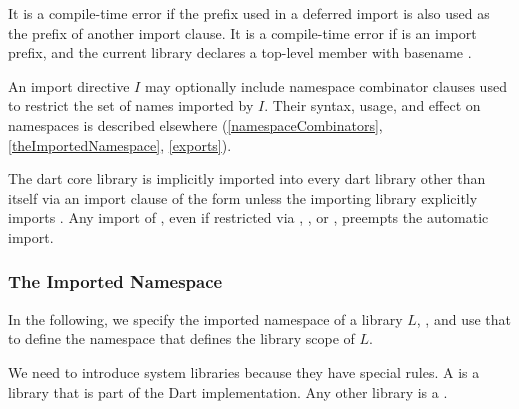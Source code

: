 \documentclass[makeidx]{article}
\begin{document}
{\LMHash{}%
It is a compile-time error if the prefix used in a deferred import
is also used as the prefix of another import clause.
It is a compile-time error if \id{} is an import prefix,
and the current library declares a top-level member with basename \id.

\LMHash{}%
An import directive $I$ may optionally include namespace combinator clauses
used to restrict the set of names imported by $I$.
Their syntax, usage, and effect on namespaces is described elsewhere
(\ref{namespaceCombinators}, \ref{theImportedNamespace},
\ref{exports}).

\LMHash{}%
The dart core library 
is implicitly imported into every dart library other than itself
via an import clause of the form
unless the importing library explicitly imports .
Any import of ,
even if restricted via \SHOW, \HIDE, or \AS,
preempts the automatic import.


\subsubsection{The Imported Namespace}

\LMHash{}%
In the following, we specify the imported namespace of a library $L$,
,
and use that to define the namespace that defines the library scope of $L$.

\LMHash{}%
We need to introduce system libraries because they have special rules.
A  is a library that is part of the Dart implementation.
Any other library is a .


}
\end{document}
